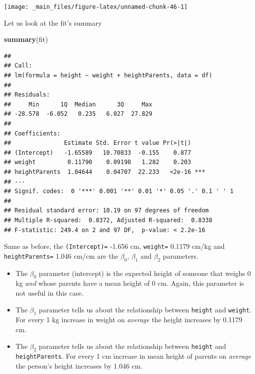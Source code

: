 \documentclass[]{book}
\newenvironment{Shaded}{\begin{snugshade}}{\end{snugshade}}
\newcommand{\KeywordTok}[1]{\textcolor[rgb]{0.13,0.29,0.53}{\textbf{#1}}}
\newcommand{\NormalTok}[1]{#1}
\providecommand{\tightlist}{%
  \setlength{\itemsep}{0pt}\setlength{\parskip}{0pt}}
\theoremstyle{definition}
\theoremstyle{definition}
\theoremstyle{definition}
\theoremstyle{remark}
\begin{document}
\begin{center}\texttt{[image: \_main\_files/figure-latex/unnamed-chunk-46-1]} \end{center}

\newpage

Let us look at the fit's summary

\begin{Shaded}
\begin{Highlighting}[]
\KeywordTok{summary}\NormalTok{(fit)}
\end{Highlighting}
\end{Shaded}

\begin{verbatim}
## 
## Call:
## lm(formula = height ~ weight + heightParents, data = df)
## 
## Residuals:
##     Min      1Q  Median      3Q     Max 
## -28.578  -6.052   0.235   6.027  27.829 
## 
## Coefficients:
##               Estimate Std. Error t value Pr(>|t|)    
## (Intercept)   -1.65589   10.70833  -0.155    0.877    
## weight         0.11790    0.09198   1.282    0.203    
## heightParents  1.04644    0.04707  22.233   <2e-16 ***
## ---
## Signif. codes:  0 '***' 0.001 '**' 0.01 '*' 0.05 '.' 0.1 ' ' 1
## 
## Residual standard error: 10.19 on 97 degrees of freedom
## Multiple R-squared:  0.8372, Adjusted R-squared:  0.8338 
## F-statistic: 249.4 on 2 and 97 DF,  p-value: < 2.2e-16
\end{verbatim}

Same as before, the \texttt{(Intercept)=} -1.656 cm, \texttt{weight=}
0.1179 cm/kg and \texttt{heightParents=} 1.046 cm/cm are the
\(\beta_0\), \(\beta_1\) and \(\beta_2\) parameters.

\begin{itemize}
\tightlist
\item
  The \(\beta_0\) parameter (intercept) is the expected height of
  someone that weighs 0 kg \emph{and} whose parents have a mean height
  of 0 cm. Again, this parameter is not useful in this case.
\item
  The \(\beta_1\) parameter tells us about the relationship between
  \texttt{height} and \texttt{weight}. For every 1 kg increase in weight
  on \emph{average} the height increases by 0.1179 cm.
\item
  The \(\beta_2\) parameter tells us about the relationship between
  \texttt{height} and \texttt{heightParents}. For every 1 cm increase in
  mean height of parents on \emph{average} the person's height increases
  by 1.046 cm.
\end{itemize}
\end{document}
